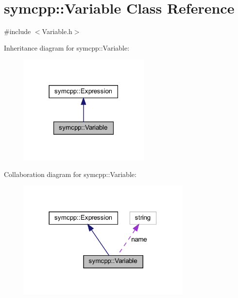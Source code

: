 \hypertarget{classsymcpp_1_1Variable}{}\section{symcpp\+::Variable Class Reference}
\label{classsymcpp_1_1Variable}


{\ttfamily \#include $<$Variable.\+h$>$}



Inheritance diagram for symcpp\+::Variable\+:
\nopagebreak
\begin{figure}[H]
\begin{center}
\leavevmode
\includegraphics[width=186pt]{classsymcpp_1_1Variable__inherit__graph}
\end{center}
\end{figure}


Collaboration diagram for symcpp\+::Variable\+:
\nopagebreak
\begin{figure}[H]
\begin{center}
\leavevmode
\includegraphics[width=246pt]{classsymcpp_1_1Variable__coll__graph}
\end{center}
\end{figure}
